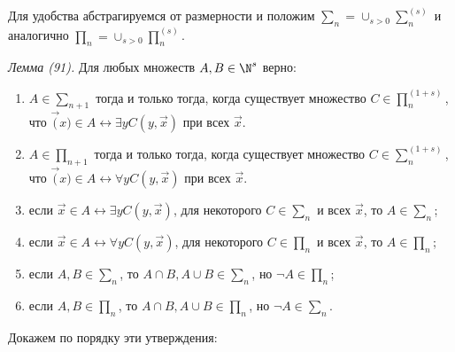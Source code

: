 \documentclass[a4paper, 10pt]{article}
\begin{document}
Для удобства абстрагируемся от размерности и положим $\sum_n = \cup_{s > 0} \sum_n^{(s)}$ и аналогично $\prod_n = \cup_{s > 0} \prod_n^{(s)}$.

\textit{Лемма (91).} Для любых множеств $A, B \in \N^{s}$ верно:

\begin{enumerate}
	\item{$A \in \sum_{n+1}$ тогда и только тогда, когда существует множество $C \in \prod_n^{(1 + s)}$, что $\vec(x) \in A \leftrightarrow \exists y C(y, \vec{x})$ при всех $\vec{x}$.}
	\item{$A \in \prod_{n+1}$ тогда и только тогда, когда существует множество $C \in \sum_n^{(1 + s)}$, что $\vec(x) \in A \leftrightarrow \forall y C(y, \vec{x})$ при всех $\vec{x}$.}
	\item{если $\vec{x} \in A \leftrightarrow \exists y C(y, \vec{x})$, для некоторого $C \in \sum_n$} и всех $\vec{x}$, то $A \in \sum_n$;
	\item{если $\vec{x} \in A \leftrightarrow \forall y C(y, \vec{x})$, для некоторого $C \in \prod_n$} и всех $\vec{x}$, то $A \in \prod_n$;
	\item{если $A, B \in \sum_n$, то $A \cap B, A \cup B \in \sum_n$, но $\lnot A \in \prod_n$};
	\item{если $A, B \in \prod_n$, то $A \cap B, A \cup B \in \prod_n$, но $\lnot A \in \sum_n$}.
\end{enumerate}
Докажем по порядку эти утверждения:
\end{document}
